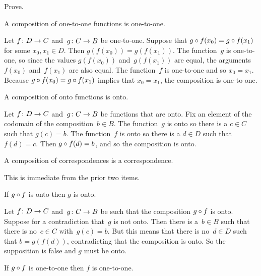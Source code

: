 \documentclass{ibl}  %
\begin{document}
\begin{problem} \label{InteractionOneToONeOntoWithComposition}
Prove.
\begin{exes}
\begin{exercise} 
  A composition of one-to-one functions is one-to-one.
\end{exercise}
\begin{answer}
  Let $\mbox{$f\colon D\to C$}$ and~$\mbox{$g\colon C\to B$}$ be one-to-one.
  Suppose that $g\mathbin{\circ} f(x_0)=g\mathbin{\circ} f(x_1)$ for
  some $x_0,x_1\in D$.
  Then $g(f(x_0))=g(f(x_1))$.
  The function~$g$ is one-to-one, so since the values $g(f(x_0))$ 
  and~$g(f(x_1))$ are equal, the arguments $f(x_0)$ and~$f(x_1)$ are
  also equal.
  The function~$f$ is one-to-one and so $x_0=x_1$.
  Because $g\mathbin{\circ} f(x_0)=g\mathbin{\circ} f(x_1)$ implies that
  $x_0=x_1$, the composition is one-to-one.  
\end{answer}
\begin{exercise} 
  A composition of onto functions is onto.
\end{exercise}
\begin{answer}
  Let $\mbox{$f\colon D\to C$}$ and~$\mbox{$g\colon C\to B$}$ be functions that are onto.
  Fix an element of the codomain of the composition~$b\in B$.
  The function~$g$ is onto so there is a $c\in C$ such that $g(c)=b$.
  The function~$f$ is onto so there is a $d\in D$ such that $f(d)=c$.
  Then $g\mathbin{\circ} f(d)=b$, and so the composition is onto.
\end{answer}
\begin{exercise} 
  A composition of correspondences is a correspondence.
\end{exercise}
\begin{answer}
  This is immediate from the prior two items. 
\end{answer}
\begin{exercise} 
  If $g\mathbin{\circ} f$ is onto then $g$ is onto.
\end{exercise}
\begin{answer}
  Let $\mbox{$f\colon D\to C$}$ and~$\mbox{$g\colon C\to B$}$ be such that 
  the composition $g\mathbin{\circ} f$ is onto.
  Suppose for a contradiction that~$g$ is not onto.
  Then there is a~$b\in B$ such that there is no~$c\in C$
  with~$g(c)=b$.
  But this means that there is no~$d\in D$ such that 
  $b=g(f(d))$, contradicting that the composition is onto.
  So the supposition is false and $g$ must be onto.  
\end{answer}
\begin{exercise} 
  If $g\mathbin{\circ} f$ is one-to-one then $f$ is one-to-one.

\end{exercise}
\end{exes}
\end{problem}
\end{document}

